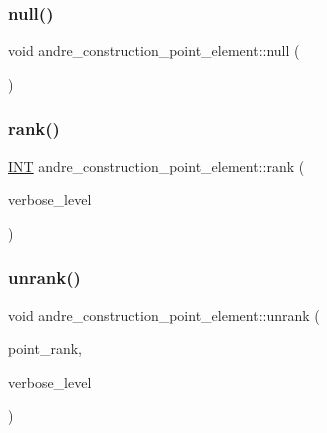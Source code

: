 \subsubsection{\texorpdfstring{null()}{null()}}
{\footnotesize\ttfamily void andre\+\_\+construction\+\_\+point\+\_\+element\+::null (\begin{DoxyParamCaption}{ }\end{DoxyParamCaption})}

\mbox{\label{classandre__construction__point__element_a8054d4b0368eb6d315a6933051b4fd20}} 
\subsubsection{\texorpdfstring{rank()}{rank()}}
{\footnotesize\ttfamily \mbox{\hyperlink{galois_8h_a09fddde158a3a20bd2dcadb609de11dc}{I\+NT}} andre\+\_\+construction\+\_\+point\+\_\+element\+::rank (\begin{DoxyParamCaption}\item[{\mbox{\hyperlink{galois_8h_a09fddde158a3a20bd2dcadb609de11dc}{I\+NT}}}]{verbose\+\_\+level }\end{DoxyParamCaption})}

\mbox{\label{classandre__construction__point__element_a12bb396e845ab283cd00ef12a525c7e1}} 
\subsubsection{\texorpdfstring{unrank()}{unrank()}}
{\footnotesize\ttfamily void andre\+\_\+construction\+\_\+point\+\_\+element\+::unrank (\begin{DoxyParamCaption}\item[{\mbox{\hyperlink{galois_8h_a09fddde158a3a20bd2dcadb609de11dc}{I\+NT}}}]{point\+\_\+rank,  }\item[{\mbox{\hyperlink{galois_8h_a09fddde158a3a20bd2dcadb609de11dc}{I\+NT}}}]{verbose\+\_\+level }\end{DoxyParamCaption})}



